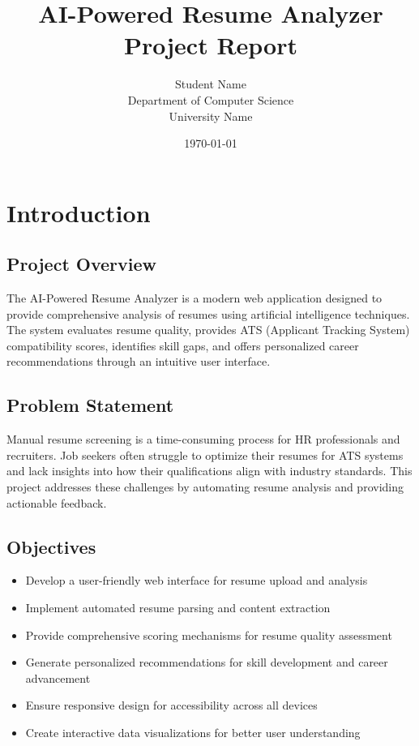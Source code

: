 \documentclass[12pt,a4paper]{article}
\title{\textbf{AI-Powered Resume Analyzer\\Project Report}}
\author{Student Name\\Department of Computer Science\\University Name}
\date{\today}
\begin{document}
\maketitle
\thispagestyle{empty}

\newpage
\tableofcontents
\newpage

\section{Introduction}

\subsection{Project Overview}
The AI-Powered Resume Analyzer is a modern web application designed to provide comprehensive analysis of resumes using artificial intelligence techniques. The system evaluates resume quality, provides ATS (Applicant Tracking System) compatibility scores, identifies skill gaps, and offers personalized career recommendations through an intuitive user interface.

\subsection{Problem Statement}
Manual resume screening is a time-consuming process for HR professionals and recruiters. Job seekers often struggle to optimize their resumes for ATS systems and lack insights into how their qualifications align with industry standards. This project addresses these challenges by automating resume analysis and providing actionable feedback.

\subsection{Objectives}
\begin{itemize}
    \item Develop a user-friendly web interface for resume upload and analysis
    \item Implement automated resume parsing and content extraction
    \item Provide comprehensive scoring mechanisms for resume quality assessment
    \item Generate personalized recommendations for skill development and career advancement
    \item Ensure responsive design for accessibility across all devices
    \item Create interactive data visualizations for better user understanding
\end{itemize}
\end{document}

